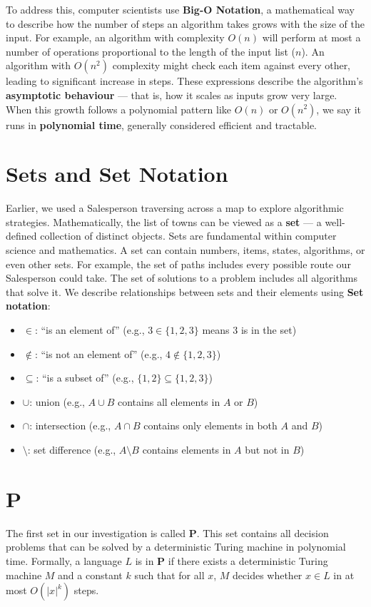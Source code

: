\documentclass[12pt]{report}
\begin{document}
To address this, computer scientists use \textbf{Big-O Notation}, a mathematical way to describe how the number of steps an algorithm takes grows with the size of the input.
For example, an algorithm with complexity $O(n)$ will perform at most a number of operations proportional to the length of the input list ($n$).
An algorithm with $O(n^2)$ complexity might check each item against every other, leading to significant increase in steps.
These expressions describe the algorithm's \textbf{asymptotic behaviour} --- that is, how it scales as inputs grow very large.
When this growth follows a polynomial pattern like $O(n)$ or $O(n^2)$, we say it runs in \textbf{polynomial time}, generally considered efficient and tractable.

\section{Sets and Set Notation}
Earlier, we used a Salesperson traversing across a map to explore algorithmic strategies.
Mathematically, the list of towns can be viewed as a \textbf{set} --- a well-defined collection of distinct objects.
Sets are fundamental within computer science and mathematics.
A set can contain numbers, items, states, algorithms, or even other sets.
For example, the set of paths includes every possible route our Salesperson could take.
The set of solutions to a problem includes all algorithms that solve it.
We describe relationships between sets and their elements using \textbf{Set notation}:
\begin{itemize}
    \item $\in$: “is an element of” (e.g., $3 \in \{1, 2, 3\}$ means 3 is in the set)
    \item $\notin$: “is not an element of” (e.g., $4 \notin \{1, 2, 3\}$)
    \item $\subseteq$: “is a subset of” (e.g., $\{1,2\} \subseteq \{1,2,3\}$)
    \item $\cup$: union (e.g., $A \cup B$ contains all elements in $A$ or $B$)
    \item $\cap$: intersection (e.g., $A \cap B$ contains only elements in both $A$ and $B$)
    \item $\setminus$: set difference (e.g., $A \setminus B$ contains elements in $A$ but not in $B$)
\end{itemize}

\section{P}
The first set in our investigation is called \textbf{P}.
This set contains all decision problems that can be solved by a deterministic Turing machine in polynomial time.
Formally, a language $L$ is in $\mathbf{P}$ if there exists a deterministic Turing machine $M$ and a constant $k$ such that for all $x$, $M$ decides whether $x \in L$ in at most $O(|x|^k)$ steps.
\end{document}
